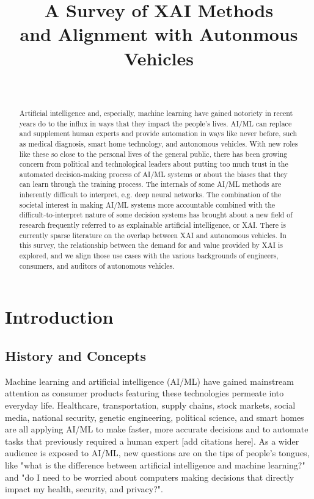 \documentclass{IEEEtran}
\begin{document}
\title{A Survey of XAI Methods\\and Alignment with Autonmous Vehicles}
\author{
    \\
}
\maketitle

\begin{abstract}
Artificial intelligence and, especially, machine learning have gained notoriety in recent years do to the influx in ways that they impact the people's lives.  AI/ML can replace and supplement human experts and provide automation in ways like never before, such as medical diagnosis, smart home technology, and autonomous vehicles.  With new roles like these so close to the personal lives of the general public, there has been growing concern from political and technological leaders about putting too much trust in the automated decision-making process of AI/ML systems or about the biases that they can learn through the training process.  The internals of some AI/ML methods are inherently difficult to interpret, e.g. deep neural networks.  The combination of the societal interest in making AI/ML systems more accountable combined with the difficult-to-interpret nature of some decision systems has brought about a new field of research frequently referred to as explainable artificial intelligence, or XAI.  There is currently sparse literature on the overlap between XAI and autonomous vehicles.  In this survey, the relationship between the demand for and value provided by XAI is explored, and we align those use cases with the various backgrounds of engineers, consumers, and auditors of autonomous vehicles.
\end{abstract}

\section{Introduction}

\subsection{History and Concepts}

Machine learning and artificial intelligence (AI/ML) have gained mainstream attention as consumer products featuring these technologies permeate into everyday life.  Healthcare, transportation, supply chains, stock markets, social media, national security, genetic engineering, political science, and smart homes are all applying AI/ML to make faster, more accurate decisions and to automate tasks that previously required a human expert [add citations here].  As a wider audience is exposed to AI/ML, new questions are on the tips of people's tongues, like "what is the difference between artificial intelligence and machine learning?" and "do I need to be worried about computers making decisions that directly impact my health, security, and privacy?".
\end{document}
